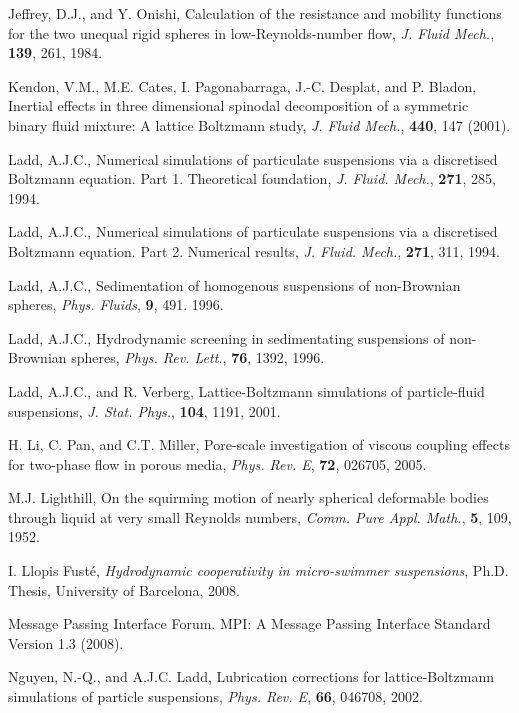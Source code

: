 \begin{thebibliography}{99}
Jeffrey, D.J., and Y. Onishi,
Calculation of the resistance and mobility functions for the two
unequal rigid spheres in low-Reynolds-number flow,
\textit{J. Fluid Mech.}, \textbf{139}, 261, 1984.

Kendon, V.M., M.E. Cates, I. Pagonabarraga, J.-C. Desplat, and
P. Bladon,
Inertial effects in three dimensional spinodal decomposition of
a symmetric binary fluid mixture: A lattice Boltzmann study,
\textit{J. Fluid Mech.}, \textbf{440}, 147 (2001).

Ladd, A.J.C., Numerical simulations of particulate suspensions
via a discretised Boltzmann equation. Part 1. Theoretical foundation,
\textit{J. Fluid. Mech.}, \textbf{271}, 285, 1994.

Ladd, A.J.C., Numerical simulations of particulate suspensions
via a discretised Boltzmann equation. Part 2. Numerical results,
\textit{J. Fluid. Mech.}, \textbf{271}, 311, 1994.

Ladd, A.J.C., Sedimentation of homogenous suspensions of non-Brownian
spheres,
\textit{Phys. Fluids}, \textbf{9}, 491. 1996.

Ladd, A.J.C., Hydrodynamic screening in sedimentating suspensions
of non-Brownian spheres,
\textit{Phys. Rev. Lett.}, \textbf{76}, 1392, 1996.

Ladd, A.J.C., and R. Verberg,
Lattice-Boltzmann simulations of particle-fluid suspensions,
\textit{J. Stat. Phys.}, \textbf{104}, 1191, 2001.

H. Li, C. Pan, and C.T. Miller,
Pore-scale investigation of viscous coupling effects for two-phase
flow in porous media,
\textit{Phys. Rev. E}, \textbf{72}, 026705, 2005.

M.J. Lighthill,
On the squirming motion of nearly spherical deformable bodies through
liquid at very small Reynolds numbers,
\textit{Comm. Pure Appl. Math.}, \textbf{5}, 109, 1952.

I. Llopis Fust\'e,
\textit{Hydrodynamic cooperativity in micro-swimmer suspensions},
Ph.D. Thesis, University of Barcelona, 2008.

Message Passing Interface Forum. MPI: A Message Passing Interface Standard
Version 1.3 (2008).

Nguyen, N.-Q., and A.J.C. Ladd, Lubrication corrections for
lattice-Boltzmann simulations of particle suspensions,
\textit{Phys. Rev. E}, \textbf{66}, 046708, 2002.


\end{thebibliography}
